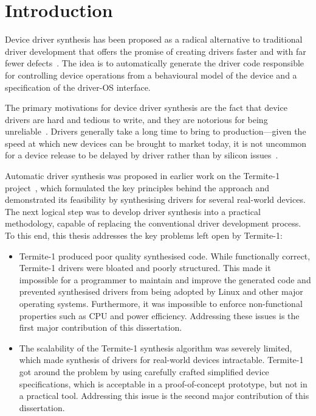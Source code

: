 \chapter{Introduction}

Device driver synthesis has been proposed as a radical alternative to traditional driver development that offers the promise of creating drivers faster and with far fewer defects~\cite{Ryzhyk_CKSH_09}. The idea is to automatically generate the driver code responsible for controlling device operations from a behavioural model of the device and a specification of the driver-OS interface.

The primary motivations for device driver synthesis are the fact that device drivers are hard and tedious to write, and they are notorious for being unreliable~\cite{Chou_YCHE_01,Ganapathi_GP_06}. Drivers generally take a long time to bring to production---given the speed at which new devices can be brought to market today, it is not uncommon for a device release to be delayed by driver rather than by silicon issues~\cite{Yavatkar_12}. 

Automatic driver synthesis was proposed in earlier work on the Termite-1 project~\cite{Ryzhyk_CKSH_09}, which formulated the key principles behind the approach and demonstrated its feasibility by synthesising drivers for several real-world devices.  The next logical step was to develop driver synthesis into a practical methodology, capable of replacing the conventional driver development process.  To this end, this thesis addresses the key problems left open by Termite-1:

\begin{itemize}
    \item Termite-1 produced poor quality synthesised code.  While functionally correct, Termite-1 drivers were bloated and poorly structured.  This made it impossible for a programmer to maintain and improve the generated code and prevented synthesised drivers from being adopted by Linux and other major operating systems.  Furthermore, it was impossible to enforce non-functional properties such as CPU and power efficiency. Addressing these issues is the first major contribution of this dissertation.
    \item The scalability of the Termite-1 synthesis algorithm was severely limited, which made synthesis of drivers for real-world devices intractable. Termite-1 got around the problem by using carefully crafted simplified device specifications, which is acceptable in a proof-of-concept prototype, but not in a practical tool. Addressing this issue is the second major contribution of this dissertation.
\end{itemize}


